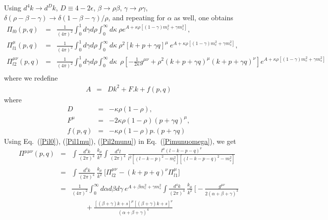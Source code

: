 \documentclass[twoside]{article}
\begin{document}
\begin{appendix}
Using $d^4 k \rightarrow d^D k$, $D \equiv 4 - 2 \epsilon$, $\beta \rightarrow \rho \beta$, $\gamma \rightarrow \rho \gamma$, $\delta(\rho - \beta - \gamma) \rightarrow \delta (1 -\beta - \gamma )/\rho$, and repeating for $\alpha$ as well, one obtains
\begin{eqnarray}
\label{Pil0}
\Pi_{l0}(p,q)
&=&
\frac{1}{(4 \pi)^2} \int_0^1 d \gamma d \rho \int_0^\infty d \kappa~
\rho e^{A+ \kappa \rho[(1 - \gamma)m_c^2 + \gamma m_s^2]}, \\
\label{Pil1mu}
\Pi_{l1}^{\mu}(p,q)
&=&
\frac{1}{(4 \pi)^2} \int_0^1 d \gamma d \rho \int_0^\infty d \kappa~
\rho^2 [k+p+\gamma q]^\mu~ 
e^{A+ \kappa \rho[(1 - \gamma)m_c^2 + \gamma m_s^2]},\\
\label{Pil2munu}
\Pi_{l2}^{\mu \nu}(p,q)
&=&
\frac{1}{(4 \pi)^2} \int_0^1 d \gamma d \rho \int_0^\infty d \kappa~
~\rho 
\left[
- \frac{1}{2 \kappa}g^{\mu \nu} + \rho^2 (k+p+\gamma q)^\mu (k+p+\gamma q)^\nu
\right]
e^{A+ \kappa \rho[(1 - \gamma)m_c^2 + \gamma m_s^2]} \nonumber\\
\end{eqnarray}
where we redefine
\begin{eqnarray}
A &=&
D k^2 + F.k + f(p,q)
\end{eqnarray}
where
\begin{eqnarray}
D &=& - \kappa \rho (1 - \rho),\\
F^\mu &=& -2 \kappa \rho (1 - \rho) (p+\gamma q)^\mu, \\
f(p,q) &=& - \kappa \rho (1 - \rho) p.(p+ \gamma q)
\end{eqnarray}
Using Eq.~(\ref{Pil0}), (\ref{Pil1mu}), (\ref{Pil2munu}) in Eq.~(\ref{Pimunuomega}), we get
\begin{eqnarray}
\label{Pimumunu}
\Pi^{\mu \mu \nu}(p,q)
&=&
\int \frac{d^4 k}{(2 \pi)^4}~ \frac{k_\mu}{k^2} 
\int \frac{d^4 l}{(2 \pi)^4}~
\frac{l^\mu (l - k - p - q)^\nu}{l^2 \left[ (l-k-p)^2 - m_c^2 \right] \left[ (l - k - p - q)^2 - m_s^2  \right]} \nonumber\\
&=&
\int \frac{d^4 k}{(2 \pi)^4}~ \frac{k_\mu}{k^2} ~
\Big[
\Pi_{l2}^{\mu \nu} - \left( k+p+q \right)^\nu \Pi_{l1}^\mu
\Big] \nonumber\\
&=&
\frac{1}{(4 \pi)^2} \int_0^\infty d \alpha d \beta d \gamma~ e^{A+\beta m_c^2 + \gamma m_s^2}
\int \frac{d^4 k}{(2 \pi)^4}~ \frac{k_\mu}{k^2} ~
\Big[
- \frac{g^{\mu \nu}}{2(\alpha+\beta+\gamma)^3} \nonumber\\ && \qquad
+ \frac{\left[ (\beta+\gamma)k + s \right]^\mu \left[ (\beta+\gamma)k+s \right]^\nu}{(\alpha+\beta+\gamma)^4}

\end{eqnarray}
\end{appendix}
\end{document}

